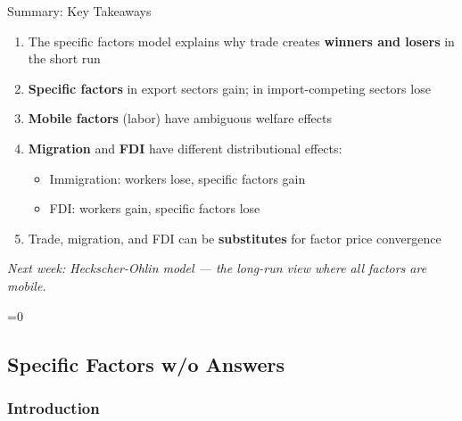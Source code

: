 \documentclass{beamer}
\newcommand{\showanswers}{1}  %
\begin{document}
\begin{frame}{Summary: Key Takeaways}

\begin{enumerate}
    \item The specific factors model explains why trade creates \textbf{winners and losers} in the short run
    
    \vspace{0.2cm}
    
    \item \textbf{Specific factors} in export sectors gain; in import-competing sectors lose
    
    \vspace{0.2cm}
    
    \item \textbf{Mobile factors} (labor) have ambiguous welfare effects
    
    \vspace{0.2cm}
    
    \item \textbf{Migration} and \textbf{FDI} have different distributional effects:
    \begin{itemize}
        \item Immigration: workers lose, specific factors gain
        \item FDI: workers gain, specific factors lose
    \end{itemize}
    
    \vspace{0.2cm}
    
    \item Trade, migration, and FDI can be \textbf{substitutes} for factor price convergence
\end{enumerate}

\vspace{0.3cm}

\textit{Next week: Heckscher-Ohlin model --- the long-run view where all factors are mobile.}

\end{frame}


\fi


\ifnum\showanswers=0

\subsection{Specific Factors w/o Answers}

\subsubsection{Introduction}
\end{document}
